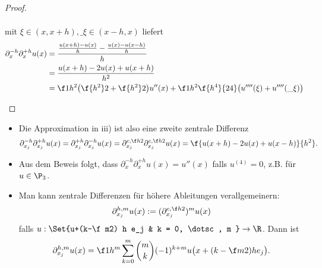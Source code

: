 \begin{st}[Approximationsgüte]
\begin{proof}
\begin{enumerate}[i)]
\begin{align*}
				\end{align*}
				mit $\xi \in (x,x+h), \_\xi \in (x-h, x)$ liefert
				\begin{align*}
					\partial_x^{-h} \partial_x^{+h} u(x)
					&= \dfrac{\frac{u(x+h)-u(x)}{h}-\frac{u(x)-u(x-h)}{h}}{h} \\
					&= \frac{u(x+h) - 2u(x) +  u(x+h)}{h^2} \\
					&= \f 1{h^2} \big( \f {h^2}2 + \f {h^2}2 \big) u''(x) + \f 1{h^2} \f {h^4}{24} \big( u''''(\xi) + u''''(\_\xi) \big)
				\end{align*}
		\end{enumerate}
	\end{proof}
	\begin{note}
		\begin{itemize}
			\item
				Die Approximation in iii) ist also eine zweite zentrale Differenz
				\[
					\partial_{x_j}^{-h} \partial_{x_j}^{+h} u(x)
					= \partial_{x_j}^{+h} \partial_{x_j}^{-h} u(x)
					= \partial_{x_j}^{c, \f h2} \partial_{x_j}^{c, \f h2} u(x)
					= \f{u(x+h) - 2u(x) + u(x-h)}{h^2}.
				\]
			\item
				Aus dem Beweis folgt, dass $\partial_x^{-h} \partial_{x}^{+h} u(x) = u''(x)$ falls $u^{(4)} = 0$, z.B. für $u \in \P_3$.
			\item
				Man kann zentrale Differenzen für höhere Ableitungen verallgemeinern:
				\[
					\partial_{x_j}^{h,m} u(x)
					:= (\partial_{x_{j}}^{c, \f h2})^m u(x)
				\]
				falls $u: \Set{u+(k-\f m2) h e_j & k = 0, \dotsc, m } \to \R$.
				Dann ist
				\[
					\partial_{x_j}^{h,m} u(x)
					= \f 1{h^m} \sum_{k=0}^m \binom{m}{k} (-1)^{k+m} u\big( x + (k-\f m2) h e_j \big).
				\]
		\end{itemize}
	\end{note}
\end{st}

